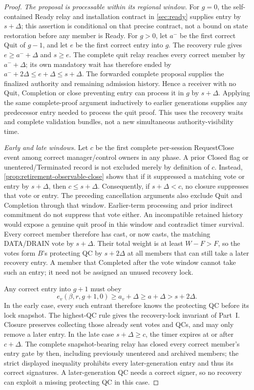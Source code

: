 \documentclass[11pt,a4paper]{article}
\begin{document}
\begin{proof}
\emph{The proposal is processable within its regional window.}
For $g=0$, the self-contained Ready relay and installation contract
in \cref{sec:ready} supplies entry by $s+\Delta$; this assertion is
conditional on that precise contract, not a bound on state restoration
before any member is Ready. For $g>0$, let $a^-$ be the first correct
Quit of $g-1$, and let $e$ be the first correct entry into $g$.
The recovery rule gives $e\ge a^-+\Delta$ and $s\ge e$.
The complete quit relay reaches every correct member by $a^-+\Delta$;
its own mandatory wait has therefore ended by
$a^-+2\Delta\le e+\Delta\le s+\Delta$. The forwarded complete
proposal supplies the finalized authority and remaining admission
history. Hence a receiver with no Quit, Completion or close preventing
entry can process it in $g$ by $s+\Delta$. Applying the same
complete-proof argument inductively to earlier generations supplies
any predecessor entry needed to process the quit proof. This uses
the recovery waits and complete validation bundles, not a
new simultaneous authority-visibility time.

\emph{Early and late windows.}
Let $c$ be the first complete per-session RequestClose event among
correct manager/control owners in any phase. A prior Closed flag or
unentered/Terminated record is not excluded merely by definition of $c$.
Instead, \cref{prop:retirement-observable-close} shows that if it
suppressed a matching vote or entry by $s+\Delta$, then $c\le s+\Delta$.
Consequently, if $s+\Delta<c$, no closure suppresses that vote or entry.
The preceding cancellation arguments also exclude Quit and Completion
through that window. Earlier-term processing and prior indirect
commitment do not suppress that vote either. An incompatible retained
history would expose a genuine quit proof in this window and contradict
timer survival. Every correct member therefore has cast, or now casts,
the matching DATA/DRAIN vote by $s+\Delta$. Their total weight is at least
$W-F>F$, so the votes form $B$'s protecting QC by $s+2\Delta$ at
all members that can still take a later recovery entry. A member that
Completed after the vote window cannot take such an entry; it need
not be assigned an unused recovery lock.

Any correct entry into $g+1$ must obey
\[
 e_v(\beta,r,g+1,0)\ge a_v+\Delta
 \ge a+\Delta>s+2\Delta.
\]
In the early case, every such entrant therefore knows the protecting
QC before its lock snapshot. The highest-QC rule gives the
recovery-lock invariant of Part~I. Closure preserves collecting those already
sent votes and QCs, and may only remove a later entry. In the late
case $s+\Delta\ge c$, the timer expires at or after $c+\Delta$.
The complete snapshot-bearing relay has closed every correct member's
entry gate by then, including previously unentered and archived members; the strict displayed
inequality prohibits every later-generation entry and thus its
correct signatures. A later-generation QC needs a correct signer,
so no recovery can exploit a missing protecting QC in this case.


\end{proof}
\end{document}
